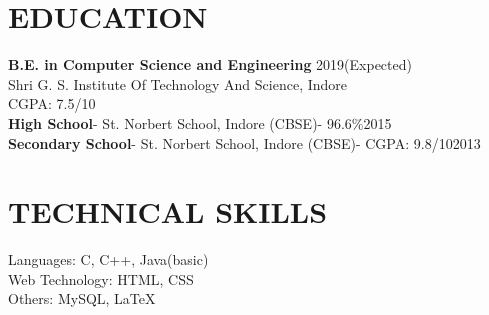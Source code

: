 \documentclass[line, margin]{res}
\begin{document}
\address{\href{mailto: sajal.agrawal1997@gmail.com}{sajal.agrawal1997@gmail.com}\\ +918878155869}
\begin{resume}

\section{EDUCATION}
\textbf{B.E. in Computer Science and Engineering} \hfill 2019(Expected)\\
Shri G. S. Institute Of Technology And Science, Indore\\
CGPA: 7.5/10\\
\textbf{High School}- St. Norbert School, Indore (CBSE)- 96.6\%\hfill 2015\\
\textbf{Secondary School}- St. Norbert School, Indore (CBSE)- CGPA: 9.8/10\hfill 2013\\

\section{TECHNICAL SKILLS}
Languages: C, C++, Java(basic)\\
Web Technology: HTML, CSS\\
Others: MySQL, \LaTeX\\


\end{resume}
\end{document}
